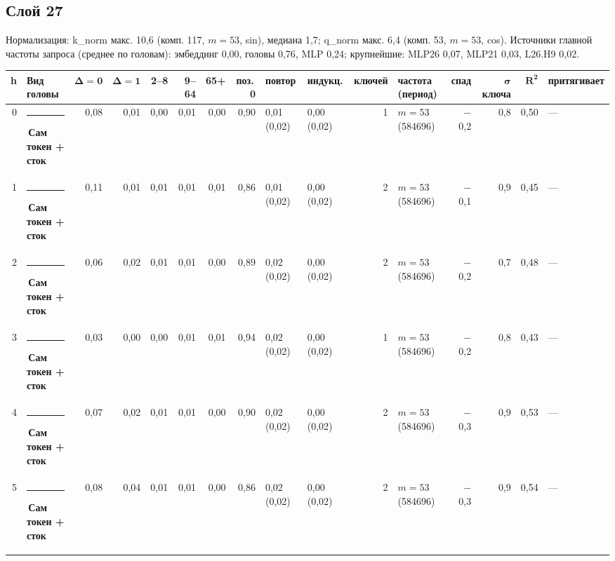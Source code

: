 \documentclass[10pt]{article}
\begin{document}
\noindent\begin{minipage}{\linewidth}
\subsection*{Слой 27}
{\small\color{ink2} Нормализация: k\_norm макс. 10,6 (комп. 117, $m{=}53$, sin), медиана 1,7; q\_norm макс. 6,4 (комп. 53, $m{=}53$, cos). Источники главной частоты запроса (среднее по головам): эмбеддинг 0,00, головы 0,76, MLP 0,24; крупнейшие: MLP26 0,07, MLP21 0,03, L26.H9 0,02.}
\begin{center}{\footnotesize\begin{tabular}{|r|l|r|r|r|r|r|r|l|l|r|l|r|r|r|l|}
\hline
\rowcolor{head}\textbf{h} & \textbf{Вид головы} & $\boldsymbol{\Delta{=}0}$ & $\boldsymbol{\Delta{=}1}$ & \textbf{2–8} & \textbf{9–64} & \textbf{65+} & \textbf{поз.\,0} & \textbf{повтор} & \textbf{индукц.} & \textbf{ключей} & \textbf{частота (период)} & \textbf{спад} & $\boldsymbol{\sigma}$ \textbf{ключа} & $\boldsymbol{R^2}$ & \textbf{притягивает} \\ \hline
0 & \textcolor[HTML]{2A78D6}{\rule{0.62em}{0.62em}}\,\textbf{Сам токен + сток} & 0,08 & 0,01 & 0,00 & 0,01 & 0,00 & 0,90 & 0,01 (0,02) & 0,00 (0,02) & 1 & $m{=}53$ (584696) & $-$0,2 & 0,8 & 0,50 & — \\ \hline
1 & \textcolor[HTML]{2A78D6}{\rule{0.62em}{0.62em}}\,\textbf{Сам токен + сток} & 0,11 & 0,01 & 0,01 & 0,01 & 0,01 & 0,86 & 0,01 (0,02) & 0,00 (0,02) & 2 & $m{=}53$ (584696) & $-$0,1 & 0,9 & 0,45 & — \\ \hline
2 & \textcolor[HTML]{2A78D6}{\rule{0.62em}{0.62em}}\,\textbf{Сам токен + сток} & 0,06 & 0,02 & 0,01 & 0,01 & 0,00 & 0,89 & 0,02 (0,02) & 0,00 (0,02) & 2 & $m{=}53$ (584696) & $-$0,2 & 0,7 & 0,48 & — \\ \hline
3 & \textcolor[HTML]{2A78D6}{\rule{0.62em}{0.62em}}\,\textbf{Сам токен + сток} & 0,03 & 0,00 & 0,00 & 0,01 & 0,01 & 0,94 & 0,02 (0,02) & 0,00 (0,02) & 1 & $m{=}53$ (584696) & $-$0,2 & 0,8 & 0,43 & — \\ \hline
4 & \textcolor[HTML]{2A78D6}{\rule{0.62em}{0.62em}}\,\textbf{Сам токен + сток} & 0,07 & 0,02 & 0,01 & 0,01 & 0,00 & 0,90 & 0,02 (0,02) & 0,00 (0,02) & 2 & $m{=}53$ (584696) & $-$0,3 & 0,9 & 0,53 & — \\ \hline
5 & \textcolor[HTML]{2A78D6}{\rule{0.62em}{0.62em}}\,\textbf{Сам токен + сток} & 0,08 & 0,04 & 0,01 & 0,01 & 0,00 & 0,86 & 0,02 (0,02) & 0,00 (0,02) & 2 & $m{=}53$ (584696) & $-$0,3 & 0,9 & 0,54 & — \\ \hline

\end{tabular}}
\end{center}
\end{minipage}
\end{document}
